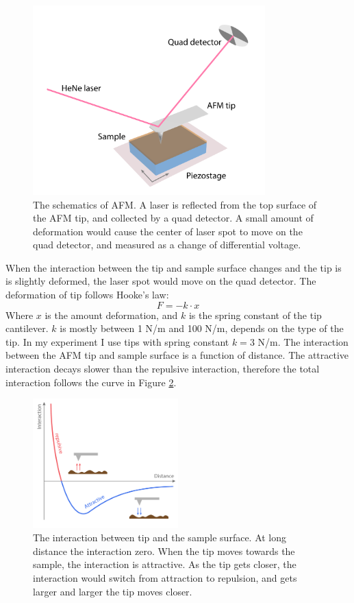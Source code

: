 \documentclass[pdflatex, sectionletters, 12pt]{pittetd}    %
\begin{document}
\begin{figure}[h!]
	\centering
	\includegraphics[width=0.8\textwidth]{Drawing/AFM.pdf}
	\caption{The schematics of AFM. A laser is reflected from the top surface of the AFM tip, and collected by a quad detector. A small amount of deformation would cause the center of laser spot to move on the quad detector, and measured as a change of differential voltage.}
	\label{FIG:AFM}
\end{figure}

When the interaction between the tip and sample surface changes and the tip is is slightly deformed, the laser spot would move on the quad detector. The deformation of tip follows Hooke's law:
$$F = -k \cdot x$$
Where $x$ is the amount deformation, and $k$ is the spring constant of the tip cantilever. $k$ is mostly between 1 N/m and 100 N/m, depends on the type of the tip. In my experiment I use tips with spring constant $k = 3$ N/m. The interaction between the AFM tip and sample surface is a function of distance. The attractive interaction decays slower than the repulsive interaction, therefore the total interaction follows the curve in Figure \ref{FIG:Interaction}.

\begin{figure}[h!]
	\centering
	\includegraphics[width=0.5\textwidth]{Drawing/Interaction.pdf}
	\caption{The interaction between tip and the sample surface. At long distance the interaction zero. When the tip moves towards the sample, the interaction is attractive. As the tip gets closer, the interaction would switch from attraction to repulsion, and gets larger and larger the tip moves closer.}
	\label{FIG:Interaction}
\end{figure}
\end{document}
